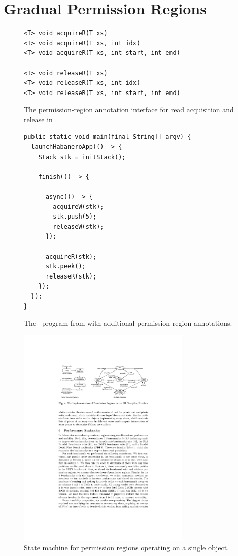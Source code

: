 \section{Gradual Permission Regions}

\begin{figure}[t]
  \centering
  \begin{lstlisting}
<T> void acquireR(T xs)
<T> void acquireR(T xs, int idx)
<T> void acquireR(T xs, int start, int end)

<T> void releaseR(T xs)
<T> void releaseR(T xs, int idx)
<T> void releaseR(T xs, int start, int end)
  \end{lstlisting}
\caption{The permission-region annotation interface for read acquisition and release in \jpf.}
\label{fig:pr-interface}
\end{figure}

\begin{figure}
  \begin{center}
    \begin{lstlisting}
public static void main(final String[] argv) {
  launchHabaneroApp(() -> {
    Stack stk = initStack();  

    finish(() -> {

      async(() -> {
        acquireW(stk);
        stk.push(5);
        releaseW(stk);
      });
      
      acquireR(stk);
      stk.peek();
      releaseR(stk);
    });
  });
}
\end{lstlisting}
  \end{center}
  \caption{The \hj\ program from  with additional permission region annotations.}
  \label{fig:hj-async-finish-pr}
\end{figure}

\begin{figure}[t]
\centering
\includegraphics[width=3.25in]{../figs/state-machine}
\caption{State machine for permission regions operating on a single object.}
\label{fig:state-machine}
\end{figure}


